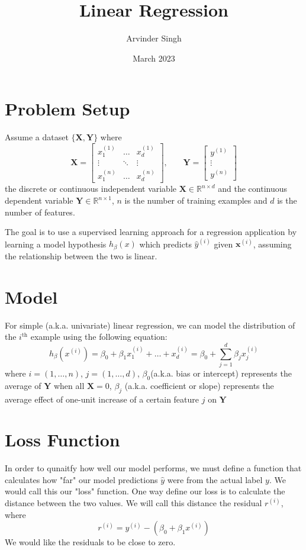 \documentclass{article}
\title{Linear Regression}
\author{Arvinder Singh}
\date{March 2023}
\begin{document}
\maketitle

\section{Problem Setup}
Assume a dataset \(\{\mathbf{X}, \mathbf{Y}\}\) where
\[
	\mathbf{X} = \begin{bmatrix}
    x^{(1)}_1 & \dots & x^{(1)}_d \\
    \vdots & \ddots & \vdots \\
    x^{(n)}_1 & \dots & x^{(n)}_d
	\end{bmatrix}
	\text{,}\qquad
	\mathbf{Y} = \begin{bmatrix}
    y^{(1)}\\
    \vdots\\
    y^{(n)}
	\end{bmatrix}
\]
the discrete or continuous independent variable \(\mathbf{X} \in \mathbb{R}^{n\times d}\) 
and the continuous dependent variable \(\mathbf{Y} \in \mathbb{R}^{n\times 1}\),
\(n\) is the number of training examples and \(d\) is the number of features.

The goal is to use a supervised learning approach for a regression application by learning a model hypothesis \(h_\beta(x)\) which predicts \(\hat y^{(i)}\) given \(\mathbf{x}^{(i)}\), assuming the relationship between the two is linear.

\section{Model}
For simple (a.k.a. univariate) linear regression, we can model the distribution of the \(i^\text{th}\) example using the following equation:
\[
	\boxed{h_\beta(x^{(i)}) = \beta_0 + \beta_1 x_1^{(i)} + \dots +  x_d^{(i)} = \beta_0 + \sum_{j=1}^d\beta_j  x_j^{(i)}}
\]
where \(i = (1,\dots,n)\), \(j = (1,\dots,d)\), \(\beta_0\)(a.k.a. bias or intercept) represents the average of \(\mathbf{Y}\) when all \(\mathbf{X} = 0\), \(\beta_j\) (a.k.a. coefficient or slope) represents the average effect of one-unit increase of a certain feature \(j\) on \(\mathbf{Y}\)

\section{Loss Function}
In order to qunaitfy how well our model performs, we must define a function that calculates how "far" our model predictions \(\hat y\) were from the actual label \(y\). We would call this our "loss" function. One way define our loss is to calculate the distance between the two values. We will call this distance the residual \(r^{(i)}\), where \[
	r^{(i)} = y^{(i)} - (\beta_0 + \beta_1 x^{(i)})
\]
We would like the residuals to be close to zero.
\end{document}
